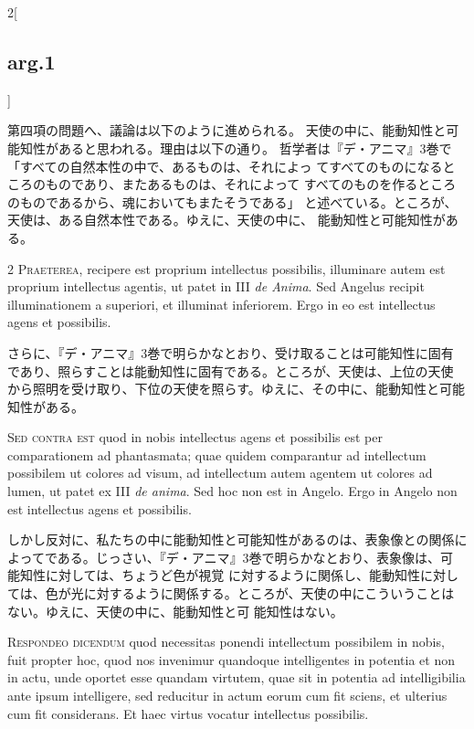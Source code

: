 \documentclass[paper=a4paper,fontsize=10pt,jafontsize=9pt,titlepage]{jlreq}
\begin{document}
\begin{paracol}{2}[\subsection{arg.1}]
\switchcolumn

第四項の問題へ、議論は以下のように進められる。
天使の中に、能動知性と可能知性があると思われる。理由は以下の通り。
哲学者は『デ・アニマ』3巻で「すべての自然本性の中で、あるものは、それによっ
 てすべてのものになるところのものであり、またあるものは、それによって
 すべてのものを作るところのものであるから、魂においてもまたそうである」
 と述べている。ところが、天使は、ある自然本性である。ゆえに、天使の中に、
 能動知性と可能知性がある。

\switchcolumn*

2 {\scshape  Praeterea}, recipere est proprium
intellectus possibilis, illuminare autem est proprium intellectus
agentis, ut patet in III {\itshape de Anima}. Sed Angelus recipit illuminationem a
superiori, et illuminat inferiorem. Ergo in eo est intellectus agens et
possibilis.

\switchcolumn

さらに、『デ・アニマ』3巻で明らかなとおり、受け取ることは可能知性に固有
 であり、照らすことは能動知性に固有である。ところが、天使は、上位の天使
 から照明を受け取り、下位の天使を照らす。ゆえに、その中に、能動知性と可能
 知性がある。

\switchcolumn*[\subsection{s.c.}]

{\scshape  Sed contra est} quod in nobis intellectus
agens et possibilis est per comparationem ad phantasmata; quae quidem
comparantur ad intellectum possibilem ut colores ad visum, ad
intellectum autem agentem ut colores ad lumen, ut patet ex III {\itshape de
anima}. Sed hoc non est in Angelo. Ergo in Angelo non est intellectus
agens et possibilis.

\switchcolumn

しかし反対に、私たちの中に能動知性と可能知性があるのは、表象像との関係に
 よってである。じっさい、『デ・アニマ』3巻で明らかなとおり、表象像は、可
 能知性に対しては、ちょうど色が視覚 に対するように関係し、能動知性に対し
 ては、色が光に対するように関係する。ところが、天使の中にこういうことは
 ない。ゆえに、天使の中に、能動知性と可 能知性はない。


{\scshape Respondeo dicendum} quod necessitas ponendi intellectum
possibilem in nobis, fuit propter hoc, quod nos invenimur quandoque
intelligentes in potentia et non in actu, unde oportet esse quandam
virtutem, quae sit in potentia ad intelligibilia ante ipsum intelligere,
sed reducitur in actum eorum cum fit sciens, et ulterius cum fit
considerans. Et haec virtus vocatur intellectus possibilis.


\end{paracol}
\end{document}
